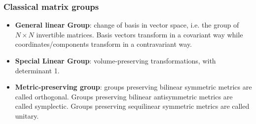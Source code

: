 \subsubsection*{Classical matrix groups}
\begin{itemize}
    \item \textbf{General linear Group}: change of basis in vector space, i.e. the group of \(N\times N\) invertible matrices. Basis vectors transform in a covariant way while coordinates/components transform in a contravariant way. 
    \item \textbf{Special Linear Group}: volume-preserving transformations, with determinant 1.
    \item \textbf{Metric-preserving group}: groups preserving bilinear symmetric metrics are called orthogonal. Groups preserving bilinear antisymmetric metrics are called symplectic. Groups preserving sequilinear symmetric metrics are called unitary.

\end{itemize}


